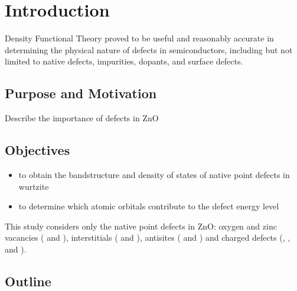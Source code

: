 \addchapheadtotoc


\chapter{Introduction}
Density Functional Theory proved to be useful and reasonably accurate in determining the physical nature of defects in semiconductors, including  but not limited to native defects, impurities, dopants, and surface defects. 

\section{Purpose and Motivation}
Describe the importance of defects in ZnO
\section{Objectives}
\begin{itemize}
    \item to obtain the bandstructure and density of states of native point defects in wurtzite 
    \item to determine which atomic orbitals  contribute to the defect energy level
\end{itemize}

This study considers only the native point defects in ZnO: oxygen and zinc vacancies ( and ), interstitials ( and ), antisites ( and ) and charged defects (, ,  and ). 
\section{Outline}

